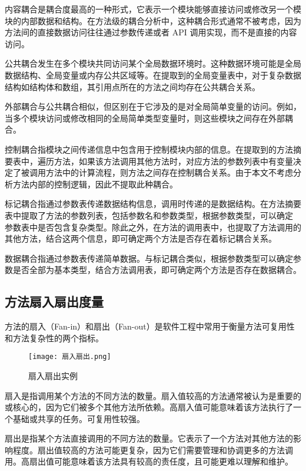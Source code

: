 内容耦合是耦合度最高的一种形式，它表示一个模块能够直接访问或修改另一个模块的内部数据和结构。在方法级的耦合分析中，这种耦合形式通常不被考虑，因为方法间的直接数据访问往往通过参数传递或者 API 调用实现，而不是直接的内容访问。

公共耦合发生在多个模块共同访问某个全局数据环境时。这种数据环境可能是全局数据结构、全局变量或内存公共区域等。在提取到的全局变量表中，对于复杂数据结构如结构体和数组，其引用点所在的方法之间均存在公共耦合关系。


外部耦合与公共耦合相似，但区别在于它涉及的是对全局简单变量的访问。例如，当多个模块访问或修改相同的全局简单类型变量时，则这些模块之间存在外部耦合。


控制耦合指模块之间传递信息中包含用于控制模块内部的信息。在提取到的方法摘
要表中，遍历方法，如果该方法调用其他方法时，对应方法的参数列表中有变量决定了被调用方法中的计算流程，则方法之间存在控制耦合关系。由于本文不考虑分析方法内部的控制逻辑，因此不提取此种耦合。


标记耦合指通过参数表传递数据结构信息，调用时传递的是数据结构。在方法摘要
表中提取了方法的参数列表，包括参数名和参数类型，根据参数类型，可以确定
参数表中是否包含复杂类型。除此之外，在方法的调用表中，也提取了方法调用的
其他方法，结合这两个信息，即可确定两个方法是否存在着标记耦合关系。


数据耦合指通过参数表传递简单数据。与标记耦合类似，根据参数类型可以确定参
数是否全部为基本类型，结合方法调用表，即可确定两个方法是否存在数据耦合。

\subsection{方法扇入扇出度量}

方法的扇入（Fan-in）和扇出（Fan-out）是软件工程中常用于衡量方法可复用性和方法复杂性的两个指标。

\begin{figure}[h]
\centering
\texttt{[image: 扇入扇出.png]}
\caption{扇入扇出实例}
\end{figure}

扇入是指调用某个方法的不同方法的数量。扇入值较高的方法通常被认为是重要的或核心的，因为它们被多个其他方法所依赖。高扇入值可能意味着该方法执行了一个基础或共享的任务。可复用性较强。


扇出是指某个方法直接调用的不同方法的数量。它表示了一个方法对其他方法的影
响程度。扇出值较高的方法可能更复杂，因为它们需要管理和协调更多的方法调用。高扇出值可能意味着该方法具有较高的责任度，且可能更难以理解和维护。


